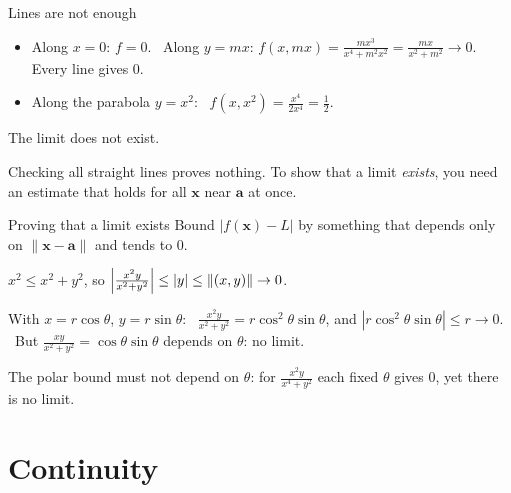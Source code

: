 \documentclass[10pt]{wosm-slides}
\newcommand{\norm}[1]{\lVert #1 \rVert}
\newcommand{\vx}{\mathbf{x}}
\newcommand{\va}{\mathbf{a}}
\begin{document}
\begin{frame}{Lines are not enough}
  \begin{example}[$f(x, y) = \dfrac{x^2 y}{x^4 + y^2}$ at $(0, 0)$]
    \begin{itemize}
      \item Along $x = 0$: $f = 0$. \ Along $y = mx$:
        $f(x, mx) = \frac{m x^3}{x^4 + m^2 x^2} = \frac{m x}{x^2 + m^2} \to 0$.
        Every line gives $0$.
      \item Along the parabola $y = x^2$: \ $f(x, x^2) = \frac{x^4}{2x^4} = \frac12$.
    \end{itemize}
    The limit does not exist.
  \end{example}
  \pause
  \begin{warning}
    Checking all straight lines proves nothing. To show that a limit \emph{exists}, you need an
    estimate that holds for all $\vx$ near $\va$ at once.
  \end{warning}
\end{frame}

\begin{frame}{Proving that a limit exists}
  Bound $|f(\vx) - L|$ by something that depends only on $\norm{\vx - \va}$ and tends to $0$.
  \begin{example}[$\lim_{(x,y)\to(0,0)} \frac{x^2 y}{x^2 + y^2} = 0$]
    $x^2 \le x^2 + y^2$, so $\Bigl|\frac{x^2 y}{x^2 + y^2}\Bigr| \le |y| \le \norm{(x, y)} \to 0$.
  \end{example}
  \pause
  \begin{example}
    With $x = r\cos\theta$, $y = r\sin\theta$: \
    $\frac{x^2 y}{x^2 + y^2} = r \cos^2\theta \sin\theta$, and $|r\cos^2\theta\sin\theta| \le r \to 0$.
    \ But $\frac{xy}{x^2 + y^2} = \cos\theta\sin\theta$ depends on $\theta$: no limit.
  \end{example}
  \pause
  {\small The polar bound must not depend on $\theta$: for $\frac{x^2y}{x^4 + y^2}$ each fixed
  $\theta$ gives $0$, yet there is no limit.\par}
\end{frame}

\section{Continuity}
\end{document}

